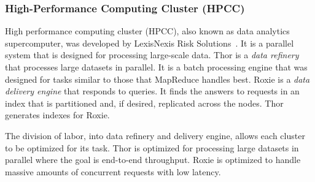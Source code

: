 \subsubsection*{High-Performance Computing Cluster (HPCC)}
\label{sec:hpcc}

High performance computing cluster (HPCC),
also known as data analytics supercomputer,
was developed by LexisNexis Risk Solutions~\cite{hpcc}.
It is a parallel system that is designed for processing large-scale data.
Thor is a \emph{data refinery} that processes large 
datasets in parallel.
It is a batch processing engine that was designed for tasks
similar to those that MapReduce handles best.
Roxie is a \emph{data delivery engine} that responds to queries.
It finds the answers to requests in an index that is partitioned and,
if desired, replicated across the nodes.
Thor generates indexes for Roxie.

The division of labor, into data refinery and delivery engine, allows
each cluster to be optimized for its task.
Thor is optimized for processing large datasets in parallel where
the goal is end-to-end throughput.
Roxie is optimized to handle massive amounts of concurrent requests
with low latency.

